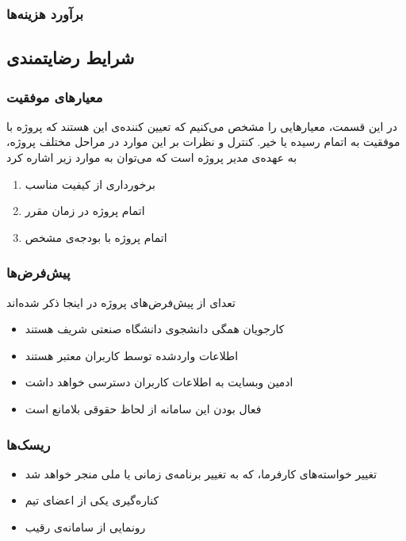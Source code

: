 \subsubsection{برآورد هزینه‌ها}


\begin{table}
\centering
{}
\end{table}


\subsection{شرایط رضایتمندی}
\subsubsection{معیار‌های موفقیت}
در این قسمت، معیار‌هایی را مشخص می‌کنیم که تعیین کننده‌ی این هستند که پروژه با موفقیت به اتمام رسیده یا خیر. کنترل و نظرات بر این موارد در مراحل مختلف پروژه، به عهده‌ی مدیر پروژه است که می‌توان به موارد زیر اشاره کرد
\begin{enumerate}
    \item برخورداری از کیفیت مناسب
    \item اتمام پروژه در زمان مقرر
    \item اتمام پروژه با بودجه‌ی مشخص
\end{enumerate}
\subsubsection{پیش‌فرض‌ها}
تعدای از پیش‌فرض‌های پروژه در اینجا ذکر شده‌اند
\begin{itemize}
    \item کارجویان همگی دانشجوی دانشگاه صنعتی شریف هستند
    \item اطلاعات واردشده توسط کاربران معتبر هستند
    \item ادمین وبسایت به اطلاعات کاربران دسترسی خواهد داشت
    \item فعال بودن این سامانه از لحاظ حقوقی بلامانع است
\end{itemize}
\subsubsection{ریسک‌ها}
\begin{itemize}
    \item تغییر خواسته‌های کارفرما، که به تغییر برنامه‌ی زمانی یا ملی منجر خواهد شد
    \item کناره‌گیری یکی از اعضای تیم
    \item رونمایی از سامانه‌ی رقیب
\end{itemize}

